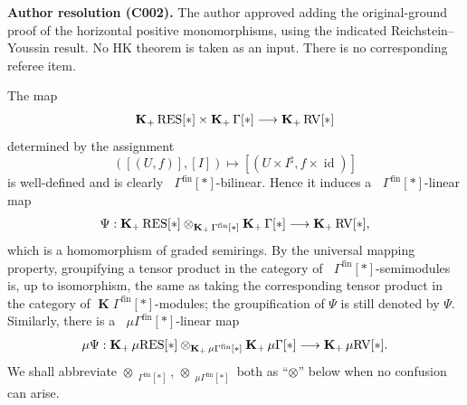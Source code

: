 \documentclass[12pt]{amsart}
\theoremstyle{plain}
\theoremstyle{definition}
\theoremstyle{remark}
\numberwithin{equation}{section}
\theoremstyle{plain}
\newcommand{\RV}{\textup{RV}}
\DeclareMathOperator{\id}{id}
\newcommand{\0}{\emptyset}
\newcommand{\fun}{\longrightarrow}
\newcommand{\efun}{\longmapsto}
\newcommand{\mgRV}{{\mu}{\RV}}
\newcommand{\mG}{{\mu}{\Gamma}}
\newcommand{\RES}{\textup{RES}}
\newcommand{\mgRES}{{\mu}{\RES}}
\DeclareMathOperator{\gsk}{\mathbf{K}_+}
\DeclareMathOperator{\ggk}{\mathbf{K}}
\DeclareMathOperator{\fin}{fin}
\begin{document}
{\normalfont\small\color{ResolutionGreen}
\noindent\textbf{Author resolution (C002).} The author approved adding
the original-ground proof of the horizontal positive monomorphisms,
using the indicated Reichstein--Youssin result. No HK theorem is taken
as an input. There is no corresponding referee item.\par}

The map
\[
\gsk \RES[*] \times \gsk \Gamma[*] \fun \gsk \RV[*]
\]
determined by the assignment
\begin{equation}\label{bil:def}
([(U, f)], [I]) \efun [(U \times I^\sharp, f \times \id)]
\end{equation}
is well-defined and is clearly $\gsk \Gamma^{\fin}[*]$-bilinear. Hence it induces a $\gsk \Gamma^{\fin}[*]$-linear map
\begin{equation}\label{tensor:expre}
\Psi: \gsk \RES[*] \otimes_{\gsk \Gamma^{\fin}[*]} \gsk \Gamma[*] \fun \gsk \RV[*],
\end{equation}
which is a homomorphism of graded semirings. By the universal mapping property, groupifying a tensor product in the category of $\gsk \Gamma^{\fin}[*]$-semimodules is, up to isomorphism, the same as taking the corresponding tensor product in the category of $\ggk \Gamma^{\fin}[*]$-modules; the groupification of $\Psi$ is still denoted by $\Psi$. Similarly, there is a
$\gsk \mG^{\fin}[*]$-linear map
\begin{equation}\label{bdd:to:2bdd}
{\mu}\Psi: \gsk \mgRES[*] \otimes_{\gsk \mG^{\fin}[*]} \gsk \mG[*] \fun \gsk \mgRV[*].
\end{equation}
We shall abbreviate $\otimes_{\gsk \Gamma^{\fin}[*]}$, $\otimes_{\gsk \mG^{\fin}[*]}$ both as ``$\otimes$'' below when no confusion can arise.
\end{document}
